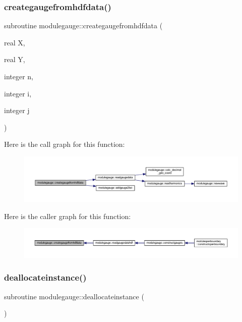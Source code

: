 \subsubsection{\texorpdfstring{creategaugefromhdfdata()}{creategaugefromhdfdata()}}
{\footnotesize\ttfamily subroutine modulegauge\+::creategaugefromhdfdata (\begin{DoxyParamCaption}\item[{real}]{X,  }\item[{real}]{Y,  }\item[{integer}]{n,  }\item[{integer}]{i,  }\item[{integer}]{j }\end{DoxyParamCaption})\hspace{0.3cm}{\ttfamily [private]}}

Here is the call graph for this function\+:\nopagebreak
\begin{figure}[H]
\begin{center}
\leavevmode
\includegraphics[width=350pt]{namespacemodulegauge_a986286ef5f7c779896aa9d9797f840cd_cgraph}
\end{center}
\end{figure}
Here is the caller graph for this function\+:\nopagebreak
\begin{figure}[H]
\begin{center}
\leavevmode
\includegraphics[width=350pt]{namespacemodulegauge_a986286ef5f7c779896aa9d9797f840cd_icgraph}
\end{center}
\end{figure}
\mbox{\label{namespacemodulegauge_a9e3c4492d77966e5e963fad0f376379f}} 
\subsubsection{\texorpdfstring{deallocateinstance()}{deallocateinstance()}}
{\footnotesize\ttfamily subroutine modulegauge\+::deallocateinstance (\begin{DoxyParamCaption}{ }\end{DoxyParamCaption})\hspace{0.3cm}{\ttfamily [private]}}


